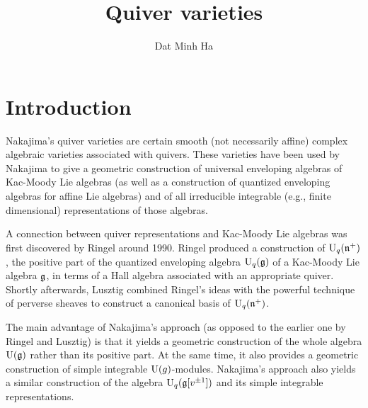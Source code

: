 

\setcounter{section}{-1}





    \title{Quiver varieties}
    
    \author{Dat Minh Ha}
    \maketitle
    
    \begin{abstract}
    
    \end{abstract}
    
    {
    \hypersetup{} 
    \tableofcontents %
    }

    \section{Introduction}
        Nakajima's quiver varieties are certain smooth (not necessarily affine) complex algebraic varieties associated with quivers. These varieties have been used by Nakajima to give a geometric construction of universal enveloping algebras of Kac-Moody Lie algebras (as well as a construction of quantized enveloping algebras for affine Lie algebras) and of all irreducible integrable (e.g., finite dimensional) representations of those algebras.

        A connection between quiver representations and Kac-Moody Lie algebras was first discovered by Ringel around 1990. Ringel produced a construction of $\mathrm{U}_q(\mathfrak{n}^+)$, the positive part of the quantized enveloping algebra $\mathrm{U}_q(\mathfrak{g})$ of a Kac-Moody Lie algebra $\mathfrak{g}$, in terms of a Hall algebra associated with an appropriate quiver. Shortly afterwards, Lusztig combined Ringel's ideas with the powerful technique of perverse sheaves to construct a canonical basis of $\mathrm{U}_q(\mathfrak{n}^+)$.
        
        The main advantage of Nakajima's approach (as opposed to the earlier one by Ringel and Lusztig) is that it yields a geometric construction of the whole algebra $\mathrm{U}(\mathfrak{g})$ rather than its positive part. At the same time, it also provides a geometric construction of simple integrable $\mathrm{U}(g)$-modules. Nakajima's approach also yields a similar construction of the algebra $\mathrm{U}_q(\mathfrak{g}[v^{\pm 1}])$ and its simple integrable representations.

